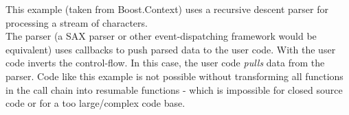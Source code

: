 \label{appendix}
This example (taken from Boost.Context\cite{bcontext}) uses a recursive descent
parser for processing a stream of characters.\\
The parser (a SAX parser or other event-dispatching framework would be
equivalent) uses callbacks to push parsed data to the user code. With \ectx the
user code inverts the control-flow. In this case, the user code \emph{pulls}
data from the parser.
Code like this example is not possible without transforming all functions in the
call chain into resumable functions - which is impossible for closed source code
or for a too large/complex code base.
